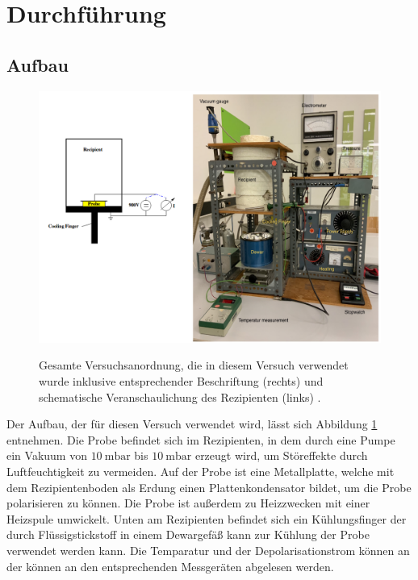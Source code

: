 
\section{Durchführung}
\label{sec:Durchführung}
\subsection{Aufbau}
\begin{figure}
\centering
\includegraphics[width=\textwidth,keepaspectratio]{Dipolrelaxation Versuchsanordnung}
\label{fig:Versuchsanordnung}
\caption{Gesamte Versuchsanordnung, die in diesem Versuch verwendet wurde inklusive entsprechender Beschriftung (rechts) und schematische Veranschaulichung  des Rezipienten (links) \cite{anleitung}.}
\end{figure}
Der Aufbau, der für diesen Versuch verwendet wird, lässt sich Abbildung \ref{fig:Versuchsanordnung} entnehmen. 
Die Probe befindet sich im Rezipienten, in dem durch eine Pumpe ein Vakuum von $\SI{10}{\milli\bar}$ bis $\SI{10}{\milli\bar}$ erzeugt wird, um Störeffekte durch Luftfeuchtigkeit zu vermeiden.
Auf der Probe ist eine Metallplatte, welche mit dem Rezipientenboden als Erdung einen Plattenkondensator bildet, um die Probe polarisieren zu können. Die Probe ist außerdem zu Heizzwecken mit einer Heizspule umwickelt. 
Unten am Rezipienten befindet sich ein Kühlungsfinger der durch Flüssigstickstoff in einem Dewargefäß kann zur Kühlung der Probe verwendet werden kann. Die Temparatur und der Depolarisationstrom können an der können an den entsprechenden Messgeräten abgelesen werden.
